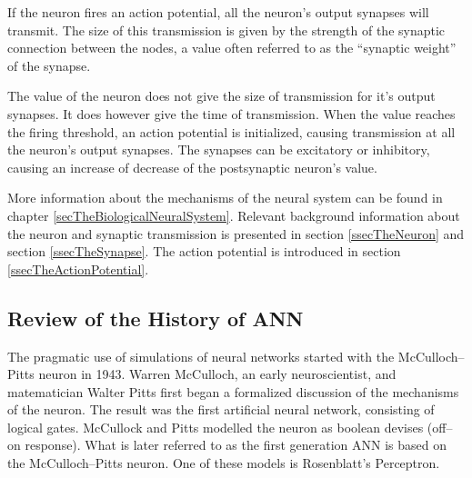 If the neuron fires an action potential, all the neuron's output synapses will transmit.
The size of this transmission is given by the strength of the synaptic connection between the nodes, a value often referred to as the ``synaptic weight'' of the synapse.

The value of the neuron does not give the size of transmission for it's output synapses. It does however give the time of transmission.%
When the value reaches the firing threshold, an action potential is initialized, causing transmission at all the neuron's output synapses.
The synapses can be excitatory or inhibitory, causing an increase of decrease of the postsynaptic neuron's value\cite{PrinciplesOfNeuralScience4edKAP02}.

More information about the mechanisms of the neural system can be found in chapter \ref{secTheBiologicalNeuralSystem}. 
Relevant background information about the neuron and synaptic transmission is presented in section \ref{ssecTheNeuron} and section \ref{ssecTheSynapse}. 
The action potential is introduced in section \ref{ssecTheActionPotential}.


\subsection{Review of the History of ANN}
\label{ssecHistoryOfANN}
The pragmatic use of simulations of neural networks started with the McCulloch--Pitts neuron in 1943. 
Warren McCulloch, an early neuroscientist, and matematician Walter Pitts first began a formalized discussion of the mechanisms of the neuron.
The result was the first artificial neural network, consisting of logical gates. McCullock and Pitts modelled the neuron as boolean devises (off--on response)\cite{MccullochPittsHistorie}. 
What is later referred to as the first generation ANN is based on the McCulloch--Pitts neuron\cite{Maass97networksof}.
One of these models is Rosenblatt's Perceptron\cite{HaykinANNbok}.

